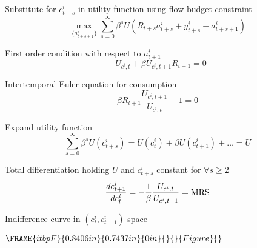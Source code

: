 \documentclass[notes=show]{beamer}
\begin{document}
\begin{frame}%


Substitute for $c_{t+s}^{i}$ in utility function using flow budget constraint%
\begin{equation*}
\underset{\{a_{t+s+1}^{i}\}}{\max }\underset{s=0}{\overset{\infty }{\sum }}%
\beta ^{s}U(R_{t+s}a_{t+s}^{i}+y_{t+s}^{i}-a_{t+s+1}^{i})
\end{equation*}

First order condition with respect to $a_{t+1}^{i}$%
\begin{equation*}
-U_{c^{i},t}+\beta U_{c^{i},t+1}R_{t+1}=0
\end{equation*}

Intertemporal Euler equation for consumption%
\begin{equation*}
\beta R_{t+1}\frac{U_{c^{i},t+1}}{U_{c^{i},t}}-1=0
\end{equation*}

\transboxout%
\end{frame}%

\begin{frame}%


Expand utility function%
\begin{equation*}
\underset{s=0}{\overset{\infty }{\sum }}\beta
^{s}U(c_{t+s}^{i})=U(c_{t}^{i})+\beta U(c_{t+1}^{i})+\ldots =\bar{U}
\end{equation*}

Total differentiation holding $\bar{U}$ and $c_{t+s}^{i}$ constant for $%
\forall s\geq 2$ 
\begin{equation*}
\frac{dc_{t+1}^{i}}{dc_{t}^{i}}=-\frac{1}{\beta }\frac{U_{c^{i},t}}{%
U_{c^{i},t+1}}=\text{MRS}
\end{equation*}

Indifference curve in $(c_{t}^{i},c_{t+1}^{i})$ space

\begin{center}
$\FRAME{itbpF}{0.8406in}{0.7437in}{0in}{}{}{Figure}{\special{language
"Scientific Word";type "GRAPHIC";maintain-aspect-ratio TRUE;display
"USEDEF";valid_file "T";width 0.8406in;height 0.7437in;depth
0in;original-width 2.7086in;original-height 2.3886in;cropleft "0";croptop
"1";cropright "1";cropbottom "0";tempfilename
'graphics/PEZU5W02.bmp';tempfile-properties "XPR";}}$
\end{center}

\transboxout%
\end{frame}%
\end{document}
